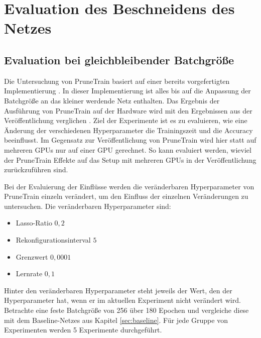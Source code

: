 
\chapter{Evaluation des Beschneidens des Netzes}\label{sec:ptexperimente}
\section{Evaluation bei gleichbleibender Batchgröße}

Die Untersuchung von PruneTrain basiert auf einer bereits vorgefertigten Implementierung \cite{ptImpl}. In dieser Implementierung ist alles bis auf die Anpassung der Batchgröße an das kleiner werdende Netz enthalten. Das Ergebnis der Ausführung von PruneTrain auf der Hardware wird mit den Ergebnissen aus der Veröffentlichung verglichen \cite{prunetrain}. Ziel der Experimente ist es zu evaluieren, wie eine Änderung der verschiedenen Hyperparameter die Trainingszeit und die Accuracy beeinflusst. Im Gegensatz zur Veröffentlichung von PruneTrain wird hier statt auf mehreren GPUs nur auf einer GPU gerechnet. So kann evaluiert werden, wieviel der PruneTrain Effekte auf das Setup mit mehreren GPUs in der Veröffentlichung zurückzuführen sind. 

Bei der Evaluierung der Einflüsse werden die veränderbaren Hyperparameter von PruneTrain einzeln verändert, um den Einfluss der einzelnen Veränderungen zu untersuchen.  
Die veränderbaren Hyperparameter sind:
\begin{itemize}
 \item Lasso-Ratio $0,2$
 \item Rekonfigurationsinterval $5$
 \item Grenzwert $0,0001$
 \item Lernrate $0,1$
\end{itemize}
Hinter den veränderbaren Hyperparameter steht jeweils der Wert, den der Hyperparameter hat, wenn er im aktuellen Experiment nicht verändert wird.
Betrachte eine feste Batchgröße von 256 über 180 Epochen und vergleiche diese mit dem Baseline-Netzes aus Kapitel \ref{sec:baseline}. Für jede Gruppe von Experimenten werden 5 Experimente durchgeführt. 


